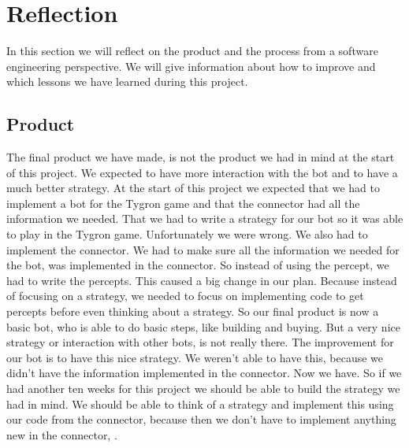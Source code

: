 \section{Reflection}
In this section we will reflect on the product and the process from a software engineering perspective. We will give information about how to improve and which lessons we have learned during this project.
\subsection{Product}
The final product we have made, is not the product we had in mind at the start of this project. We expected to have more interaction with the bot and to have a much better strategy. At the start of this project we expected that we had to implement a bot for the Tygron game and that the connector had all the information we needed. That we had to write a strategy for our bot so it was able to play in the Tygron game. Unfortunately we were wrong. We also had to implement the connector. We had to make sure all the information we needed for the bot, was implemented in the connector. So instead of using the percept, we had to write the percepts. This caused a big change in our plan. Because instead of focusing on a strategy, we needed to focus on implementing code to get percepts before even thinking about a strategy. So our final product is now a basic bot, who is able to do basic steps, like building and buying. But a very nice strategy or interaction with other bots, is not really there. The improvement for our bot is to have this nice strategy. We weren't able to have this, because we didn't have the information implemented in the connector. Now we have. So if we had another ten weeks for this project we should be able to build the strategy we had in mind. We should be able to think of a strategy and implement this using our code from the connector, because then we don't have to implement anything new in the connector, .

